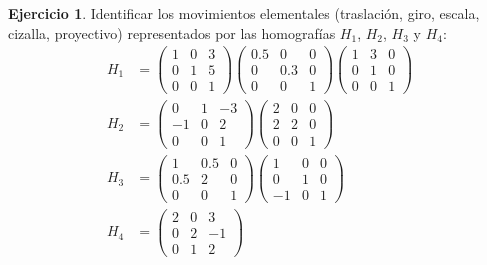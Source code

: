 \documentclass[a4paper, 11pt]{article}
\theoremstyle{definition}
\newtheorem{ejercicio}{Ejercicio}
\theoremstyle{theorem}
\begin{document}
  \begin{ejercicio}
      Identificar los movimientos elementales (traslación, giro, escala, cizalla, proyectivo) representados por las homografías $H_1$, $H_2$, $H_3$ y $H_4$:
      \begin{align*}
          H_1 &= \left(
          \begin{array}{ccc}
              1 & 0 & 3 \\
              0 & 1 & 5 \\
              0 & 0 & 1
          \end{array}
          \right)
          \left(
          \begin{array}{ccc}
              0.5 & 0 & 0 \\
              0 & 0.3 & 0 \\
              0 & 0 & 1
          \end{array}
          \right)
          \left(
          \begin{array}{ccc}
              1 & 3 & 0 \\
              0 & 1 & 0 \\
              0 & 0 & 1
          \end{array}
          \right) \\
          H_2 &= \left(
          \begin{array}{ccc}
              0 & 1 & -3 \\
              -1 & 0 & 2 \\
              0 & 0 & 1
          \end{array}
          \right)
          \left(
          \begin{array}{ccc}
              2 & 0 & 0 \\
              2 & 2 & 0 \\
              0 & 0 & 1
          \end{array}
          \right) \\
          H_3 &= \left(
          \begin{array}{ccc}
              1 & 0.5 & 0 \\
              0.5 & 2 & 0 \\
              0 & 0 & 1
          \end{array}
          \right)
          \left(
          \begin{array}{ccc}
              1 & 0 & 0 \\
              0 & 1 & 0 \\
              -1 & 0 & 1
          \end{array}
          \right)\\
          H_4 &= \left(
          \begin{array}{ccc}
              2 & 0 & 3 \\
              0 & 2 & -1 \\
              0 & 1 & 2
          \end{array}
          \right)
      \end{align*}
  \end{ejercicio}
\end{document}
